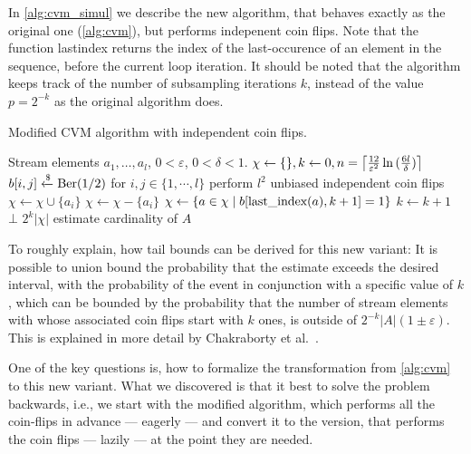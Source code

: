 In \cref{alg:cvm_simul} we describe the new algorithm, that behaves exactly as the original one (\cref{alg:cvm}), but performs indepenent coin flips.
Note that the function last{\textunderscore}index returns the index of the last-occurence of an element in the sequence, before the current loop iteration.
It should be noted that the algorithm keeps track of the number of subsampling iterations $k$, instead of the value $p = 2^{-k}$ as the original algorithm does.
%
\begin{algorithm}[h!]
	\caption{Modified CVM algorithm with independent coin flips.}\label{alg:cvm_simul}
	\begin{algorithmic}[1]
  \Require Stream elements $a_1,\dots,a_l$, $0 < \varepsilon$, $0 < \delta < 1$.
  \State $\chi \gets \{\}, k \gets 0, n = \ceil*{\frac{12}{\varepsilon^2} \ln{(\frac{6l}{\delta})} }$
  \State $b[i,j] \getsr \Ber(1/2)$ for $i,j \in \{1,\cdots,l\}$ \Comment perform $l^2$ unbiased independent coin flips
      \State $\chi \gets \chi \cup \{a_i\}$
    \Else
      \State $\chi \gets \chi - \{a_i\}$
    \EndIf
      \State $\chi \gets \{a \in \chi \;|\; b[\textrm{last{\textunderscore}index}(a),k+1] = 1\}$
      \State $k \gets k+1$
    \EndIf
      \State \Return $\bot$
    \EndIf
  \EndFor
  \State \Return $2^k |\chi|$ \Comment estimate cardinality of $A$
  \end{algorithmic}
\end{algorithm}
To roughly explain, how tail bounds can be derived for this new variant:
It is possible to union bound the probability that the estimate exceeds the desired interval, with the probability of the event in conjunction with a specific value of $k$, which can be bounded by the probability that the number of stream elements with whose associated coin flips start with $k$ ones, is outside of $2^{-k} |A| (1 \pm \varepsilon)$.
This is explained in more detail by Chakraborty et al.~\cite{chakraborty2022}.

One of the key questions is, how to formalize the transformation from \cref{alg:cvm} to this new variant.
What we discovered is that it best to solve the problem backwards, i.e., we start with the modified algorithm, which performs all the coin-flips in advance --- eagerly --- and convert it to the version, that performs the coin flips --- lazily --- at the point they are needed.


